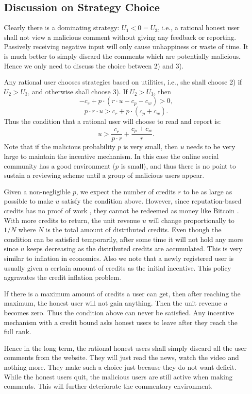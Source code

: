 \documentclass[12pt]{article}
\begin{document}
\subsection{Discussion on Strategy Choice}
Clearly there is a dominating strategy: $U_1 < 0 = U_3$, i.e., a rational honest user shall not view a malicious comment without giving any feedback or reporting. Passively receiving negative input will only cause unhappiness or waste of time. It is much better to simply discard the comments which are potentially malicious. Hence we only need to discuss the choice between 2) and 3).

Any rational user chooses strategies based on utilities, i.e., she shall choose 2) if $U_2 > U_3$, and otherwise shall choose 3). If $U_2 > U_3$, then
$$-c_r + p\cdot(r\cdot u -c_p-c_w) > 0,$$
$$p\cdot r\cdot u > c_r+p\cdot(c_p+c_w).$$
Thus the condition that a rational user will choose to read and report is:
$$u > \frac{c_r}{p\cdot r} + \frac{c_p+c_w}{r}.$$
Note that if the malicious probability $p$ is very small, then $u$ needs to be very large to maintain the incentive mechanism. In this case the online social community has a good environment ($p$ is small), and thus there is no point to sustain a reviewing scheme until a group of malicious users appear.

Given a non-negligible $p$, we expect the number of credits $r$ to be as large as possible to make $u$ satisfy the condition above. However, since reputation-based credits has no proof of work \cite{PoW}, they cannot be redeemed as money like Bitcoin \cite{BCoin}. With more credits to return, the unit revenue $u$ will change proportionally to $1/N$ where $N$ is the total amount of distributed credits. Even though the condition can be satisfied temporarily, after some time it will not hold any more since $u$ keeps decreasing as the distributed credits are accumulated. This is very similar to inflation in economics. Also we note that a newly registered user is usually given a certain amount of credits as the initial incentive. This policy aggravates the credit inflation problem.

If there is a maximum amount of credits a user can get, then after reaching the maximum, the honest user will not gain anything. Then the unit revenue $u$ becomes zero. Thus the condition above can never be satisfied. Any incentive mechanism with a credit bound asks honest users to leave after they reach the full rank.

Hence in the long term, the rational honest users shall simply discard all the user comments from the website. They will just read the news, watch the video and nothing more. They make such a choice just because they do not want deficit. While the honest users quit, the malicious users are still active when making comments. This will further deteriorate the commentary environment.
\end{document}
